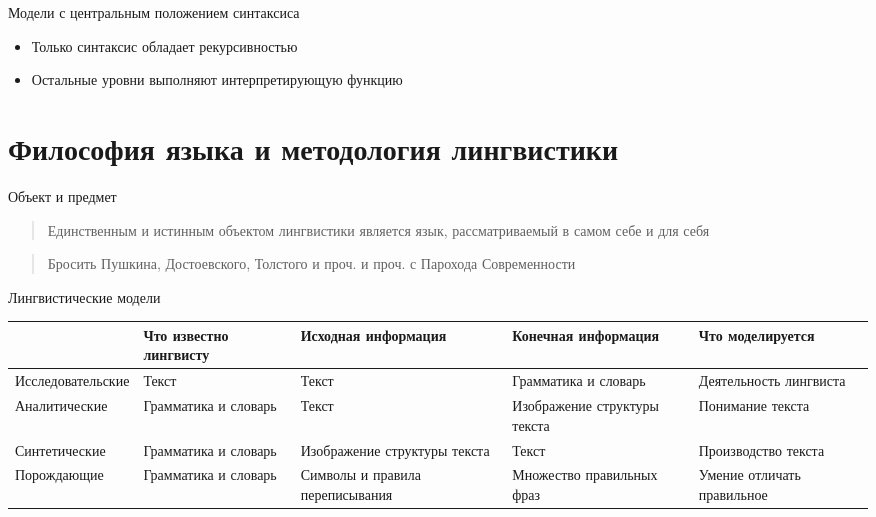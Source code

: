 \begin{frame}{Модели с центральным положением синтаксиса}
    \begin{itemize}
        \item Только синтаксис обладает рекурсивностью
        \item Остальные уровни выполняют интерпретирующую функцию
    \end{itemize}
\end{frame}

\section{Философия языка и методология лингвистики}

\frame{\tableofcontents[currentsection]}

\begin{frame}{Объект и предмет}
    \begin{quote}
        Единственным и истинным объектом лингвистики является язык, рассматриваемый в самом себе и для себя
    \end{quote}

    \vfill

    \begin{quote}
        Бросить Пушкина, Достоевского, Толстого и проч. и проч. с Парохода Современности
    \end{quote}
\end{frame}

\begin{frame}{Лингвистические модели}
    \begin{table}[t]
        \begin{tabularx}{\textwidth}{XXXXX}
            & Что известно лингвисту & Исходная информация & Конечная информация & Что моделируется \\ \midrule \midrule
            Исследова\-тельские & Текст & Текст & Грамматика и словарь & Деятельность лингвиста \\ \midrule
            Аналитические & Грамматика и словарь & Текст & Изображение структуры текста & Понимание текста \\ \midrule
            Синтетические & Грамматика и словарь & Изображение структуры текста & Текст & Производство текста \\ \midrule
            Порождающие & Грамматика и словарь & Символы и правила переписывания & Множество правильных фраз & Умение отличать правильное \\ \midrule
        \end{tabularx}
    \end{table}
\end{frame}

